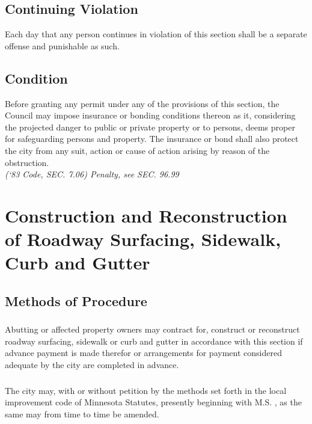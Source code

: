 \subsection{Continuing Violation}
Each day that any person continues in violation of this section shall be a separate offense and punishable as such.
\subsection{Condition}
Before granting any permit under any of the provisions of this section, the Council may impose insurance or bonding conditions thereon as it, considering the projected danger to public or private property or to persons, deems proper for safeguarding persons and property.  The insurance or bond shall also protect the city from any suit, action or cause of action arising by reason of the obstruction.\\
\emph{(‘83 Code, SEC. 7.06)  Penalty, see SEC. 96.99}
\section{Construction and Reconstruction of Roadway Surfacing, Sidewalk, Curb and Gutter}
\subsection{Methods of Procedure}
\subsubsection{}
Abutting or affected property owners may contract for, construct or reconstruct roadway surfacing, sidewalk or curb and gutter in accordance with this section if advance payment is made therefor or arrangements for payment considered adequate by the city are completed in advance.
\subsubsection{}
The city may, with or without petition by the methods set forth in the local improvement code of Minnesota Statutes, presently beginning with M.S. , as the same may from time to time be amended.
